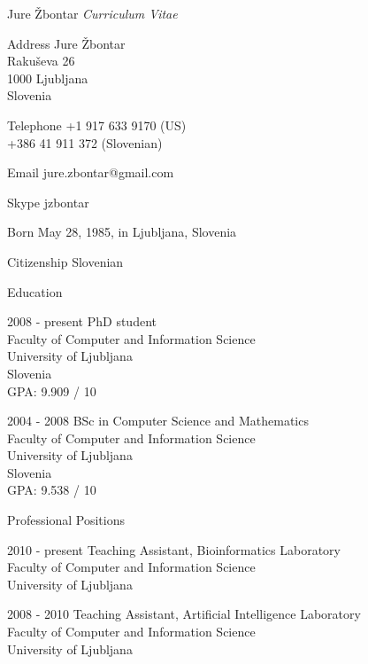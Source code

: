 \documentclass[12pt,a4paper]{article}
\begin{document}
\begin{cv}{Jure \v{Z}bontar}
\noindent \emph{Curriculum Vitae}

\begin{cvlist}{}
\item[Address] Jure \v{Z}bontar \\
Raku\v{s}eva 26 \\
1000 Ljubljana \\
Slovenia

\item[Telephone] 
+1 917 633 9170 (US) \\
+386 41 911 372 (Slovenian)

\item[Email] jure.zbontar@gmail.com

\item[Skype] jzbontar

\item[Born] May 28, 1985, in Ljubljana, Slovenia
\item[Citizenship] Slovenian

\end{cvlist}

\begin{cvlist}{Education}
\item[2008 - present] PhD student \\
Faculty of Computer and Information Science \\
University of Ljubljana \\
Slovenia \\
GPA: 9.909 / 10

\item[2004 - 2008] BSc in Computer Science and Mathematics \\
Faculty of Computer and Information Science \\
University of Ljubljana \\
Slovenia \\
GPA: 9.538 / 10

\end{cvlist}


\begin{cvlist}{Professional Positions}
\item[2010 - present] Teaching Assistant, Bioinformatics Laboratory  \\
Faculty of Computer and Information Science \\
University of Ljubljana

\item[2008 - 2010] Teaching Assistant, Artificial Intelligence Laboratory \\
Faculty of Computer and Information Science \\
University of Ljubljana


\end{cvlist}
\end{cv}
\end{document}
